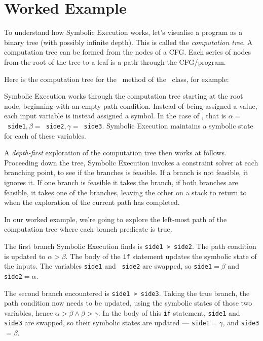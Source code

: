 \section{Worked Example}

To understand how Symbolic Execution works, let's visualise a program as a
binary tree (with possibly infinite depth). This is called the {\it computation
tree}. A computation tree can be formed from the nodes of a CFG. Each series of
nodes from the root of the tree to a leaf is a path through the CFG/program.

Here is the computation tree for the \classifymethod~method of the
\triangleclass~class, for example:


Symbolic Execution works through the computation tree starting at the root node,
beginning with an empty path condition. Instead of being assigned a value, each
input variable is instead assigned a symbol. In the case of \classifymethod,
that is $\alpha=$~{\tt side1}$, \beta= $~{\tt side2}$, \gamma=$~{\tt side3}.
Symbolic Execution maintains a symbolic state for each of these variables. 

A {\it depth-first} exploration of the computation tree then works at follows.
Proceeding down the tree, Symbolic Execution invokes a constraint solver at each
branching point, to see if the branches is feasible. If a branch is not
feasible, it ignores it. If one branch is feasible it takes the branch, if both
branches are feasible, it takes one of the branches, leaving the other on a
stack to return to when the exploration of the current path has completed. 

In our worked example, we're going to explore the left-most path of the
computation tree where each branch predicate is true.

The first branch Symbolic Execution finds is {\tt side1 > side2}. The path
condition is updated to $\alpha > \beta$. The body of the {\tt if} statement
updates the symbolic state of the inputs. The variables {\tt side1} and {\tt
side2} are swapped, so {\tt side1}$ = \beta$ and {\tt side2}$ = \alpha$. 

The second branch encountered is {\tt side1 > side3}. Taking the true branch,
the path condition now needs to be updated, using the symbolic states of those
two variables, hence $\alpha > \beta \wedge \beta > \gamma$. In the body of this
{\tt if} statement, {\tt side1} and {\tt side3} are swapped, so their symbolic
states are updated --- {\tt side1}$ = \gamma$, and {\tt side3}$ = \beta$.

